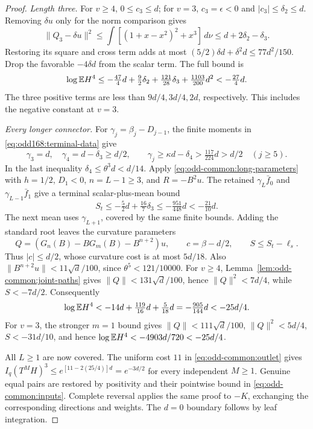 \begin{proof}
\emph{Length three.}
For \(v\ge4\), \(0\le c_3\le d\); for \(v=3\),
\(c_3=\epsilon<0\) and \(|c_3|\le\delta_2\le d\).
Removing \(\delta u\) only for the norm comparison gives
\[
 \|Q_3-\delta u\|^2\le
       \int[(1+x-x^2)^2+x^3]\,d\nu
       \le d+2\delta_2-\delta_3.
\]
Restoring its square and cross term adds at most
\((5/2)\delta d+\delta^2d\le77d^2/150\).
Drop the favorable \(-4\delta d\) from the scalar term. The full bound is
\[
 \log\mathbb E H^4\le-\tfrac{47}{4}d+\tfrac92\delta_2
                 +\tfrac{121}{28}\delta_3+\tfrac{1103}{200}d^2
 <-\tfrac{27}{4}d.
\]
The three positive terms are less than \(9d/4,3d/4,2d\),
respectively. This includes the negative constant at \(v=3\).

\label{part:C168.8}\emph{Every longer connector.}
For \(\gamma_j=\beta_j-D_{j-1}\), the finite moments in
\eqref{eq:odd168:terminal-data} give
\begin{equation}\label{eq:odd168:gamma}
 \gamma_3=d,\quad\gamma_4=d-\delta_3\ge d/2,
 \qquad\gamma_j\ge\kappa d-\delta_4
       >\tfrac{117}{224}d>d/2\quad(j\ge5).
\end{equation}
In the last inequality \(\delta_4\le\theta^3d<d/14\).
Apply \eqref{eq:odd-common:long-parameters} with \(h=1/2\),
\(D_1<0\), \(n=L-1\ge3\), and \(R=-B^2u\).
The retained \(\gamma_L\bar f_0\) and
\(\gamma_{L-1}\bar f_1\) give a terminal scalar-plus-mean bound
\begin{equation}\label{eq:odd168:long-mean}
 S_t\le-\tfrac52d+\tfrac{16}{7}\delta_3
       \le-\tfrac{951}{448}d<-\tfrac{21}{10}d.
\end{equation}
The next mean uses \(\gamma_{L+1}\), covered by the same finite bounds.
Adding the standard root leaves the curvature parameters
\begin{equation}\label{eq:odd168:long-parameters}
 Q=(G_n(B)-BG_m(B)-B^{n+2})u,
 \qquad c=\beta-d/2,\qquad S\le S_t-\ell_s.
\end{equation}
Thus \(|c|\le d/2\), whose curvature cost is at most \(5d/18\).
Also \(\|B^{n+2}u\|<11\sqrt d/100\), since
\(\theta^5<121/10000\).
For \(v\ge4\), Lemma~\ref{lem:odd-common:joint-paths} gives
\(\|Q\|<131\sqrt d/100\), hence \(\|Q\|^2<7d/4\), while
\(S<-7d/2\). Consequently
\[
 \log\mathbb E H^4<-14d+\tfrac{119}{16}d+\tfrac5{18}d
        =-\tfrac{905}{144}d<-25d/4.
\]
For \(v=3\), the stronger \(m=1\) bound gives
\(\|Q\|<111\sqrt d/100\), \(\|Q\|^2<5d/4\),
\(S<-31d/10\), and hence
\(\log\mathbb E H^4<-4903d/720<-25d/4\).

All \(L\ge1\) are now covered. The uniform cost \(11\) in
\eqref{eq:odd-common:outlet} gives
\(I_q(T^MH)^3\le e^{[11-2(25/4)]d}=e^{-3d/2}\)
for every independent \(M\ge1\).
Genuine equal pairs are restored by positivity and their pointwise
bound in \eqref{eq:odd-common:inputs}. Complete reversal applies the
same proof to \(-K\), exchanging the corresponding directions and
weights. The \(d=0\) boundary follows by leaf integration.
\end{proof}

